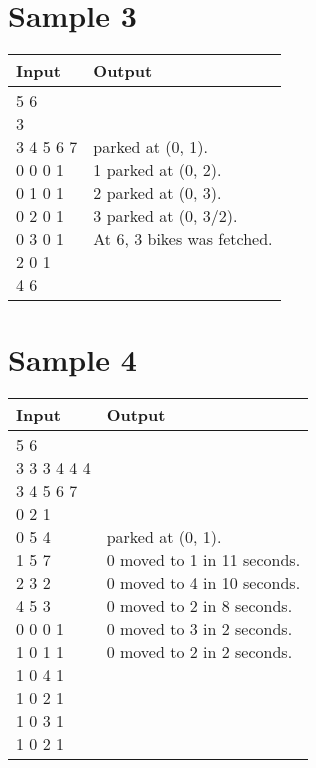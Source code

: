 \documentclass[11pt,a4paper]{article}
\begin{document}
\section*{Sample 3}
\begin{longtable}[!h]{|p{}|p{}|}
\hline
\textbf{Input} & \textbf{Output} \\
\hline
\parbox[t]{0.5\textwidth}{ 5 6\\
3\\
3 4 5 6 7\\
0 0 0 1\\
0 1 0 1\\
0 2 0 1\\
0 3 0 1\\
2 0 1\\
4 6\\
}
&
\parbox[t]{0.5\textwidth}{ parked at (0, 1).\\
1 parked at (0, 2).\\
2 parked at (0, 3).\\
3 parked at (0, 3/2).\\
At 6, 3 bikes was fetched.
} \\
\hline
\end{longtable}

\section*{Sample 4}
\begin{longtable}[!h]{|p{}|p{}|}
\hline
\textbf{Input} & \textbf{Output} \\
\hline
\parbox[t]{0.5\textwidth}{ 5 6\\
3 3 3 4 4 4\\
3 4 5 6 7\\
0 2 1\\
0 5 4\\
1 5 7\\
2 3 2\\
4 5 3\\
0 0 0 1\\
1 0 1 1\\
1 0 4 1\\
1 0 2 1\\
1 0 3 1\\
1 0 2 1\\
}
&
\parbox[t]{0.5\textwidth}{ parked at (0, 1).\\
0 moved to 1 in 11 seconds.\\
0 moved to 4 in 10 seconds.\\
0 moved to 2 in 8 seconds.\\
0 moved to 3 in 2 seconds.\\
0 moved to 2 in 2 seconds.
} \\
\hline
\end{longtable}
\newpage
\end{document}
